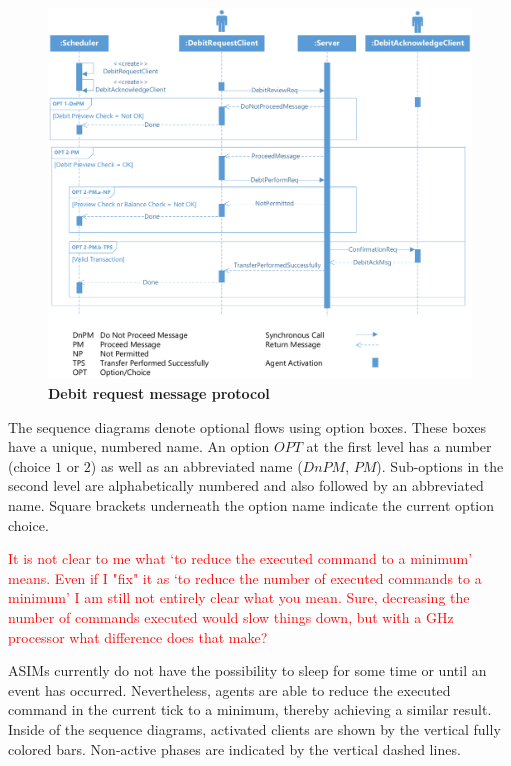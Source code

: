 \begin{figure}[htbp]
  \centering
  \includegraphics[width=1.0\textwidth]{Figures/debitrequest}
  \caption{\bf\small Debit request message protocol}
  \label{fig:impl-msg-drc}
\end{figure}

The sequence diagrams denote optional flows using option boxes. These boxes have a unique, numbered name. An option $OPT$ at the first level has a number (choice $1$ or $2$) as well as an abbreviated name ($DnPM$, $PM$). Sub-options in the second level are alphabetically numbered and also followed by an abbreviated name. Square brackets underneath the option name indicate the current option choice.

\textcolor{red}{It is not clear to me what `to reduce the executed command to a minimum' means. Even if I "fix" it as `to reduce the number of executed commands to a minimum' I am still not entirely clear what you mean. Sure, decreasing the number of commands executed would slow things down, but with a GHz processor what difference does that make?}

ASIMs currently do not have the possibility to sleep for some time or until an event has occurred. Nevertheless, agents are able to reduce the executed command in the current tick to a minimum, thereby achieving a similar result. Inside of the sequence diagrams, activated clients are shown by the vertical fully colored bars. Non-active phases are indicated by the vertical dashed lines.


